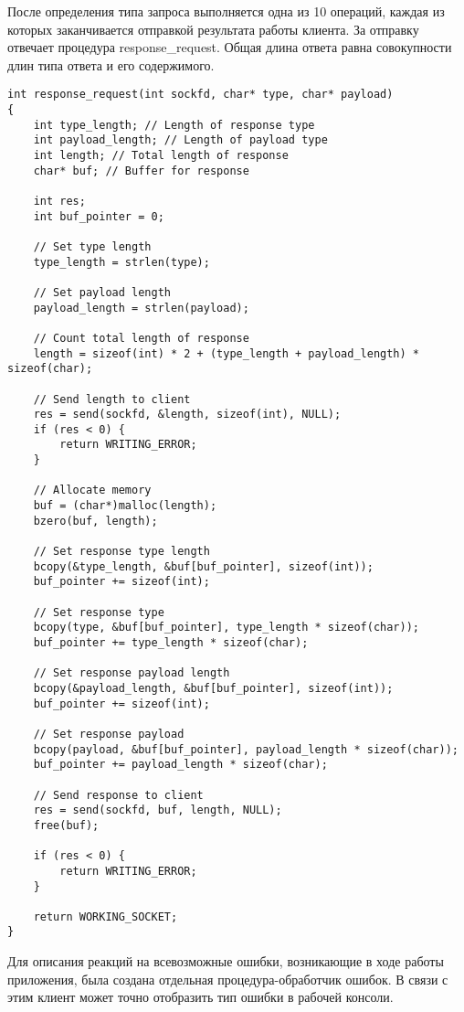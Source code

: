 После определения типа запроса выполняется одна из 10 операций, каждая из которых заканчивается отправкой результата работы клиента. За отправку отвечает процедура response\_request. Общая длина ответа равна совокупности длин типа ответа и его содержимого.

\begin{lstlisting}
int response_request(int sockfd, char* type, char* payload)
{
	int type_length; // Length of response type
	int payload_length; // Length of payload type
	int length; // Total length of response
	char* buf; // Buffer for response

	int res;
	int buf_pointer = 0;

	// Set type length
	type_length = strlen(type);

	// Set payload length
	payload_length = strlen(payload);

	// Count total length of response
	length = sizeof(int) * 2 + (type_length + payload_length) * sizeof(char);

	// Send length to client
	res = send(sockfd, &length, sizeof(int), NULL);
	if (res < 0) {
		return WRITING_ERROR;
	}

	// Allocate memory
	buf = (char*)malloc(length);
	bzero(buf, length);

	// Set response type length
	bcopy(&type_length, &buf[buf_pointer], sizeof(int));
	buf_pointer += sizeof(int);

	// Set response type
	bcopy(type, &buf[buf_pointer], type_length * sizeof(char));
	buf_pointer += type_length * sizeof(char);

	// Set response payload length
	bcopy(&payload_length, &buf[buf_pointer], sizeof(int));
	buf_pointer += sizeof(int);

	// Set response payload
	bcopy(payload, &buf[buf_pointer], payload_length * sizeof(char));
	buf_pointer += payload_length * sizeof(char);

	// Send response to client
	res = send(sockfd, buf, length, NULL);
	free(buf);

	if (res < 0) {
		return WRITING_ERROR;
	}

	return WORKING_SOCKET;
}
\end{lstlisting}

Для описания реакций на всевозможные ошибки, возникающие в ходе работы приложения, была создана отдельная процедура-обработчик ошибок. В связи с этим клиент может точно отобразить тип ошибки в рабочей консоли.

